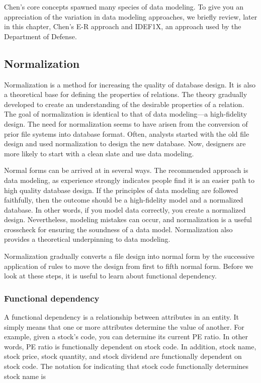 \documentclass[
]{article}
\begin{document}
Chen's core concepts spawned many species of data modeling. To give you
an appreciation of the variation in data modeling approaches, we briefly
review, later in this chapter, Chen's E-R approach and IDEF1X, an
approach used by the Department of Defense.

\hypertarget{normalization}{%
\subsection*{Normalization}\label{normalization}}

Normalization is a method for increasing the quality of database design.
It is also a theoretical base for defining the properties of relations.
The theory gradually developed to create an understanding of the
desirable properties of a relation. The goal of normalization is
identical to that of data modeling---a high-fidelity design. The need
for normalization seems to have arisen from the conversion of prior file
systems into database format. Often, analysts started with the old file
design and used normalization to design the new database. Now, designers
are more likely to start with a clean slate and use data modeling.

Normal forms can be arrived at in several ways. The recommended approach
is data modeling, as experience strongly indicates people find it is an
easier path to high quality database design. If the principles of data
modeling are followed faithfully, then the outcome should be a
high-fidelity model and a normalized database. In other words, if you
model data correctly, you create a normalized design. Nevertheless,
modeling mistakes can occur, and normalization is a useful crosscheck
for ensuring the soundness of a data model. Normalization also provides
a theoretical underpinning to data modeling.

Normalization gradually converts a file design into normal form by the
successive application of rules to move the design from first to fifth
normal form. Before we look at these steps, it is useful to learn about
functional dependency.

\hypertarget{functional-dependency}{%
\subsubsection*{Functional dependency}\label{functional-dependency}}

A functional dependency is a relationship between attributes in an
entity. It simply means that one or more attributes determine the value
of another. For example, given a stock's code, you can determine its
current PE ratio. In other words, PE ratio is functionally dependent on
stock code. In addition, stock name, stock price, stock quantity, and
stock dividend are functionally dependent on stock code. The notation
for indicating that stock code functionally determines stock name is
\end{document}
